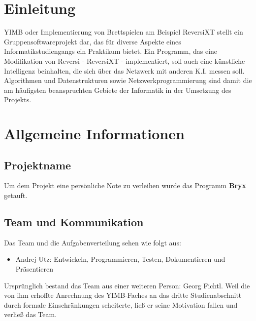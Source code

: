 \documentclass[12pt,a4paper]{article}
\begin{document}
\section{Einleitung}
YIMB oder \glqq Implementierung von Brettspielen am Beispiel ReversiXT\grqq{} stellt ein Gruppensoftwareprojekt dar, das für diverse Aspekte eines 
Informatikstudiengangs ein Praktikum bietet. Ein Programm, das eine Modifikation von Reversi - ReversiXT - implementiert, soll auch eine künstliche 
Intelligenz beinhalten, die sich über das Netzwerk mit anderen K.I. messen soll. Algorithmen und Datenstrukturen sowie Netzwerkprogrammierung sind 
damit die am häufigsten beanspruchten Gebiete der Informatik in der Umsetzung des Projekts.


\newpage
\section{Allgemeine Informationen}

\subsection{Projektname}
Um dem Projekt eine persönliche Note zu verleihen wurde das Programm \glqq \textbf{Bryx}\grqq{} getauft.


\subsection{Team und Kommunikation}
Das Team und die Aufgabenverteilung sehen wie folgt aus:
\begin{itemize}
	\item Andrej Utz: Entwickeln, Programmieren, Testen, Dokumentieren und Präsentieren
\end{itemize}

Ursprünglich bestand das Team aus einer weiteren Person: Georg Fichtl. Weil die von ihm erhoffte Anrechnung des YIMB-Faches an das dritte Studienabschnitt durch formale Einschränkungen scheiterte, ließ er seine Motivation fallen und verließ das Team.
\end{document}
